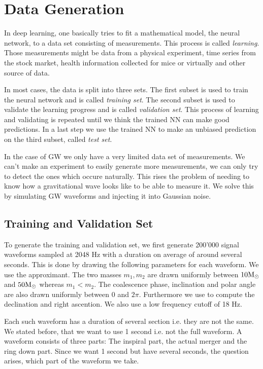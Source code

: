 
\section{Data Generation}
In deep learning, one basically tries to fit a mathematical model, the neural
network, to a data set consisting of measurements. This process is called
\textit{learning}.
Those measurements might be data from a physical experiment, time series from
the stock market, health information collected for mice or virtually and
other source of data.

In most cases, the data is split into three sets. The first subset is used to
train the neural network and is called \textit{training set}. The second subset 
is used to validate the learning progress and is called \textit{validation set}.
This process of learning and validating is repeated until we think the trained
NN can make good predictions. In a last step we use the trained NN to make an
unbiased prediction on the third subset, called \textit{test set}.

In the case of GW we only have a very limited data set of measurements. We can't
make an experiment to easily generate more measurements, we can only try to 
detect the ones which occure naturally. This rises the problem of needing to 
know how a gravitational wave looks like to be able to measure it. We solve this
by simulating GW waveforms and injecting it into Gaussian noise.

\subsection{Training and Validation Set}
To generate the training and validation set, we first generate 200'000 signal
waveforms sampled at 2048 Hz with a duration on average of around several seconds.
This is done by drawing the following parameters for each waveform.
We use the  approximant. The
two masses $m_1, m_2$ are drawn uniformly between $10 \textup{M}_\odot$ and
$50 \textup{M}_\odot$ whereas $m_1 < m_2$. The coalescence phase, inclination and
polar angle are also drawn uniformly between $0$ and $2 \pi$. Furthermore we use
 to compute the declination and right
ascention. We also use a low frequency cutoff of 18 Hz.

Each such waveform has a duration of several section i.e. they are not the same.
We stated before, that we want to use 1 second i.e. not the full waveform. A
 waveform consists of three parts: The inspiral part, the actual merger and the
 ring down part. Since we want 1 second but have several seconds, the question
 arises, which part of the waveform we take.

